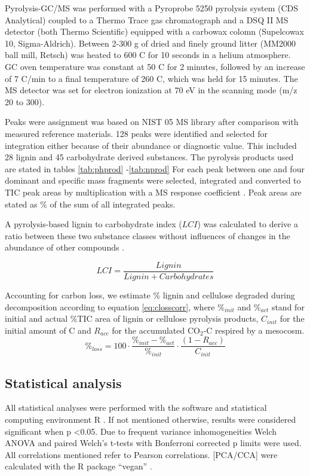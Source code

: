 Pyrolysis-GC/MS was performed with a Pyroprobe 5250 pyrolysis system (CDS Analytical) coupled to a Thermo Trace gas chromatograph and a DSQ II MS detector (both Thermo Scientific) equipped with a carbowax colomn (Supelcowax 10, Sigma-Aldrich). Between 2-300 \textmu g of dried and finely ground litter (MM2000 ball mill, Retsch) was heated to 600 \textdegree C for 10 seconds in a helium atmosphere. GC oven temperature was constant at 50 \textdegree C for 2 minutes, followed by an increase of 7 \textdegree C/min to a final temperature of 260 \textdegree C, which was held for 15 minutes. The MS detector was set for electron ionization at 70 eV in the scanning mode (m/z 20 to 300).

Peaks were assignment was based on NIST 05 MS library after comparison with measured reference materials. 128 peaks were identified and selected for integration either because of their abundance or diagnostic value. This included 28 lignin and 45 carbohydrate derived substances. The pyrolysis products used are stated in tables \ref{tab:phprod} -\ref{tab:nprod} For each peak between one and four dominant and specific mass fragments were selected, integrated and converted to TIC peak areas by multiplication with a MS response coefficient \cite{Schellekens2009, Kuder1998}. Peak areas are stated as \% of the sum of all integrated peaks.

A pyrolysis-based lignin to carbohydrate index ($LCI$) was calculated to derive a ratio between these two substance classes without influences of changes in the abundance of other compounds . 

\begin{equation}
 LCI=\frac{Lignin}{Lignin + Carbohydrates}
\end{equation}

Accounting for carbon loss, we estimate \% lignin and cellulose degraded during decomposition according to equation \ref{eq:closscorr}, where \emph{$\%_{init}$} and \emph{$\%_{act}$} stand for initial and actual \%TIC area of lignin or cellulose pyrolysis products, \emph{$C_{init}$} for the initial amount of C and \emph{$R_{acc}$} for the accumulated CO$_2$-C respired by a mesocosm.
\begin{equation}
 \%_{loss} = 100\cdot\frac{\%_{init}-\%_{act}}{\%_{init}}\cdot\frac{\left ( 1-R_{acc}\right ) }{C_{init}}
 \label{eq:closscorr}
\end{equation}



\subsection*{Statistical analysis}
All statistical analyses were performed with the software and statistical computing environment R \cite{R}. If not mentioned otherwise, results were considered significant when p \textless 0.05. Due to frequent variance inhomogeneities Welch ANOVA and paired Welch's t-tests with Bonferroni corrected p limits were used. All correlations mentioned refer to Pearson correlations. [PCA/CCA] were calculated with the R package ``vegan'' \cite{vegan}.
